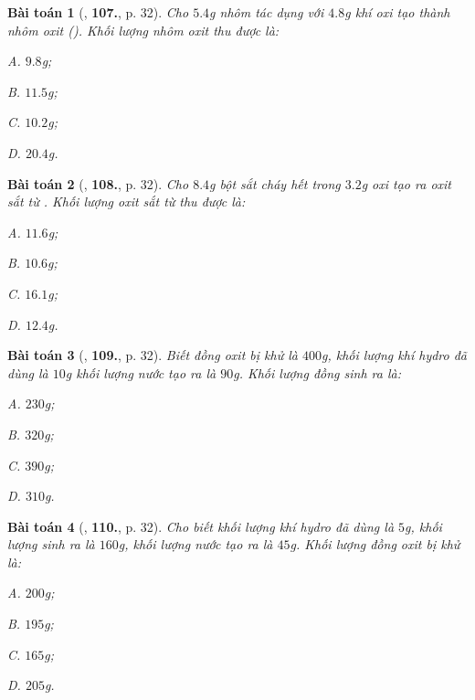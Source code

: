 \documentclass{article}
\numberwithin{equation}{section}
\newtheorem{baitoan}{Bài toán}[section]
\begin{document}
\begin{baitoan}[\cite{An2011}, \textbf{107.}, p. 32]
	Cho $5.4$g nhôm tác dụng với $4.8$g khí oxi tạo thành nhôm oxit (). Khối lượng nhôm oxit thu được là:
	\begin{enumerate*}
		\item[{\rm\sf A.}] $9.8$g;
		\item[{\rm\sf B.}] $11.5$g;
		\item[{\rm\sf C.}] $10.2$g;
		\item[{\rm\sf D.}] $20.4$g.
	\end{enumerate*}
\end{baitoan}

\begin{baitoan}[\cite{An2011}, \textbf{108.}, p. 32]
	Cho $8.4$g bột sắt cháy hết trong $3.2$g oxi tạo ra oxit sắt từ . Khối lượng oxit sắt từ thu được là:
	\begin{enumerate*}
		\item[{\rm\sf A.}] $11.6$g;
		\item[{\rm\sf B.}] $10.6$g;
		\item[{\rm\sf C.}] $16.1$g;
		\item[{\rm\sf D.}] $12.4$g.
	\end{enumerate*}
\end{baitoan}

\begin{baitoan}[\cite{An2011}, \textbf{109.}, p. 32]
	Biết đồng oxit  bị khử là $400$g, khối lượng khí hydro đã dùng là $10$g khối lượng nước tạo ra là $90$g. Khối lượng đồng sinh ra là:
	\begin{enumerate*}
		\item[{\rm\sf A.}] $230$g;
		\item[{\rm\sf B.}] $320$g;
		\item[{\rm\sf C.}] $390$g;
		\item[{\rm\sf D.}] $310$g.
	\end{enumerate*}
\end{baitoan}

\begin{baitoan}[\cite{An2011}, \textbf{110.}, p. 32]
	Cho biết khối lượng khí hydro đã dùng là $5$g, khối lượng  sinh ra là $160$g, khối lượng nước tạo ra là $45$g. Khối lượng đồng oxit bị khử là:
	\begin{enumerate*}
		\item[{\rm\sf A.}] $200$g;
		\item[{\rm\sf B.}] $195$g;
		\item[{\rm\sf C.}] $165$g;
		\item[{\rm\sf D.}] $205$g.
	\end{enumerate*}
\end{baitoan}
\end{document}
